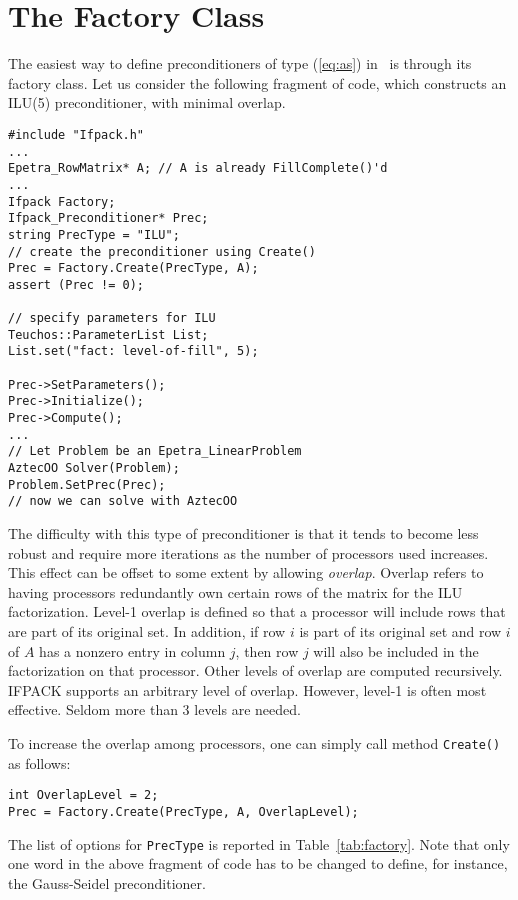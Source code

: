 \section{The Factory Class}
\label{sec:factory}

The easiest way to define preconditioners of type (\ref{eq:as}) in
  \ifpack\ is through its factory class. Let us consider
the following fragment of code, which constructs an ILU(5) preconditioner,
  with minimal overlap.
\begin{verbatim}
#include "Ifpack.h"
...
Epetra_RowMatrix* A; // A is already FillComplete()'d
...
Ifpack Factory;
Ifpack_Preconditioner* Prec;
string PrecType = "ILU";
// create the preconditioner using Create()
Prec = Factory.Create(PrecType, A);
assert (Prec != 0);

// specify parameters for ILU
Teuchos::ParameterList List;
List.set("fact: level-of-fill", 5);

Prec->SetParameters();
Prec->Initialize();
Prec->Compute();
...
// Let Problem be an Epetra_LinearProblem
AztecOO Solver(Problem);
Problem.SetPrec(Prec);
// now we can solve with AztecOO
\end{verbatim}

The difficulty with this type of preconditioner is that it tends to become
less robust and require more iterations as the number of processors used
increases.  This effect can be offset to some extent by allowing {\em
overlap}.  Overlap refers to having processors redundantly own certain rows
of the matrix for the ILU factorization.  Level-1 overlap is defined so
that a processor will include rows that are part of its original set.  In
addition, if row $i$ is part of its original set and row $i$ of $A$ has a
nonzero entry in column $j$, then row $j$ will also be included in the
factorization on that processor.  Other levels of overlap are computed
recursively.  IFPACK supports an arbitrary level of overlap.  However,
level-1 is often most effective.  Seldom more than 3 levels are needed. 

To increase the overlap among processors, one can simply call method
\verb!Create()! as follows:
\begin{verbatim}
int OverlapLevel = 2;
Prec = Factory.Create(PrecType, A, OverlapLevel);
\end{verbatim}


The list of options for {\tt PrecType} is reported in
Table~\ref{tab:factory}. Note that only one word in the above fragment of code
has to be changed to define, for instance, the Gauss-Seidel preconditioner.

